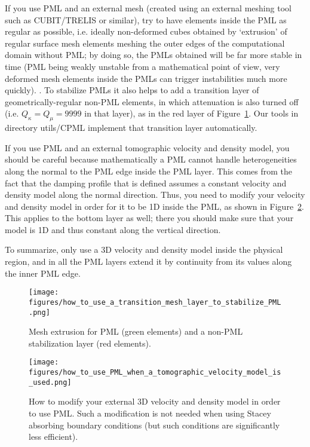 If you use PML and an external mesh (created using an external meshing tool
such as CUBIT/TRELIS or similar), try to have elements inside the PML as regular as possible,
i.e. ideally non-deformed cubes obtained by `extrusion' of regular surface mesh elements meshing the
outer edges of the computational domain without PML; by doing so, the PMLs obtained will be far more stable
in time (PML being weakly unstable from a mathematical point of view, very deformed mesh elements
inside the PMLs can trigger instabilities much more quickly). . To stabilize PMLs it also helps to add a transition layer of geometrically-regular non-PML elements, in which attenuation is also
turned off (i.e. $Q_\kappa = Q_\mu = 9999$ in that layer), as in the red layer of Figure~\ref{fig:mesh_extrusion}.
Our tools in directory utils/CPML implement that transition layer automatically.

If you use PML and an external tomographic velocity and density model,
you should be careful because mathematically a PML cannot handle heterogeneities
along the normal to the PML edge inside the PML layer. This comes
from the fact that the damping profile that is defined assumes a constant
velocity and density model along the normal direction.
Thus, you need to modify your velocity and density model in order
for it to be 1D inside the PML, as shown in Figure~\ref{fig:modify_external_velocity_model_to_use_PML}.
This applies to the bottom layer as well; there you should make sure
that your model is 1D and thus constant along the vertical direction.

To summarize, only use a 3D velocity and density model inside the
physical region, and in all the PML layers extend it by continuity
from its values along the inner PML edge.

\begin{figure}[htbp]
\noindent \begin{centering}
\texttt{[image: figures/how\_to\_use\_a\_transition\_mesh\_layer\_to\_stabilize\_PML.png]}
\par\end{centering}
\caption{Mesh extrusion for PML (green elements) and a non-PML stabilization layer (red elements).}
\label{fig:mesh_extrusion}
\end{figure}

\begin{figure}[htbp]
\noindent \begin{centering}
\texttt{[image: figures/how\_to\_use\_PML\_when\_a\_tomographic\_velocity\_model\_is\_used.png]}
\par\end{centering}
\caption{How to modify your external 3D velocity and density model in order
to use PML. Such a modification is not needed when using Stacey absorbing
boundary conditions (but such conditions are significantly less efficient).}
\label{fig:modify_external_velocity_model_to_use_PML}
\end{figure}


